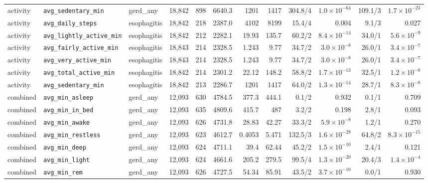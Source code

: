 \documentclass[11pt]{article}
\newcommand{\code}[1]{\texttt{\small #1}}
\begin{document}
\begin{longtable}{@{}p{1.4cm}p{2.9cm}p{1.7cm}rrrr rrrr r@{}}
activity & \code{avg\_sedentary\_min} & gerd\_any & 18{,}842 & 898 & 6640.3 &  1201 &  1417 & 304.8/4 & $1.0\times10^{-64}$ & 109.1/3 & $1.7\times10^{-23}$ \\
activity & \code{avg\_daily\_steps} & esophagitis & 18{,}842 & 218 & 2387.0 &  4102 &  8199 & 15.4/4 & 0.004 & 9.1/3 & 0.027 \\
activity & \code{avg\_lightly\_active\_min} & esophagitis & 18{,}842 & 212 & 2282.1 & 19.93 & 135.7 & 60.2/2 & $8.4\times10^{-14}$ & 34.0/1 & $5.6\times10^{-9}$ \\
activity & \code{avg\_fairly\_active\_min} & esophagitis & 18{,}843 & 214 & 2328.5 & 1.243 &  9.77 & 34.7/2 & $3.0\times10^{-8}$ & 26.0/1 & $3.4\times10^{-7}$ \\
activity & \code{avg\_very\_active\_min} & esophagitis & 18{,}843 & 214 & 2328.5 & 1.243 &  9.77 & 34.7/2 & $3.0\times10^{-8}$ & 26.0/1 & $3.4\times10^{-7}$ \\
activity & \code{avg\_total\_active\_min} & esophagitis & 18{,}842 & 214 & 2301.2 & 22.12 & 148.2 & 58.8/2 & $1.7\times10^{-13}$ & 32.5/1 & $1.2\times10^{-8}$ \\
activity & \code{avg\_sedentary\_min} & esophagitis & 18{,}842 & 213 & 2286.7 &  1201 &  1417 & 64.0/2 & $1.3\times10^{-14}$ & 28.7/1 & $8.3\times10^{-8}$ \\
combined & \code{avg\_min\_asleep} & gerd\_any & 12{,}093 & 630 & 4784.5 & 377.3 & 444.1 & 0.1/2 & 0.932 & 0.1/1 & 0.709 \\
combined & \code{avg\_min\_in\_bed} & gerd\_any & 12{,}093 & 635 & 4809.6 & 415.7 &   487 & 3.2/2 & 0.198 & 2.8/1 & 0.093 \\
combined & \code{avg\_min\_awake} & gerd\_any & 12{,}093 & 626 & 4731.8 & 28.83 & 42.27 & 33.3/2 & $5.9\times10^{-8}$ & 1.2/1 & 0.270 \\
combined & \code{avg\_min\_restless} & gerd\_any & 12{,}093 & 623 & 4612.7 & 0.4053 & 5.471 & 132.5/3 & $1.6\times10^{-28}$ & 64.8/2 & $8.3\times10^{-15}$ \\
combined & \code{avg\_min\_deep} & gerd\_any & 12{,}093 & 624 & 4711.1 &  39.4 & 62.44 & 45.2/2 & $1.5\times10^{-10}$ & 2.4/1 & 0.121 \\
combined & \code{avg\_min\_light} & gerd\_any & 12{,}093 & 624 & 4661.6 & 205.2 & 279.5 & 99.5/4 & $1.3\times10^{-20}$ & 20.4/3 & $1.4\times10^{-4}$ \\
combined & \code{avg\_min\_rem} & gerd\_any & 12{,}093 & 626 & 4727.5 & 54.34 & 85.91 & 43.5/2 & $3.7\times10^{-10}$ & 0.0/1 & 0.930 \\

\end{longtable}
\end{document}
